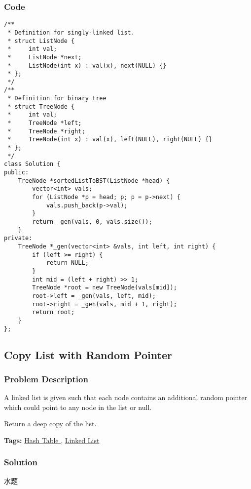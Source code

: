 \documentclass{article}
\begin{document}
\begin{CJK*}{UTF8}{gkai}
\subsubsection*{Code}
\begin{lstlisting}
/**
 * Definition for singly-linked list.
 * struct ListNode {
 *     int val;
 *     ListNode *next;
 *     ListNode(int x) : val(x), next(NULL) {}
 * };
 */
/**
 * Definition for binary tree
 * struct TreeNode {
 *     int val;
 *     TreeNode *left;
 *     TreeNode *right;
 *     TreeNode(int x) : val(x), left(NULL), right(NULL) {}
 * };
 */
class Solution {
public:
    TreeNode *sortedListToBST(ListNode *head) {
        vector<int> vals;
        for (ListNode *p = head; p; p = p->next) {
            vals.push_back(p->val);
        }
        return _gen(vals, 0, vals.size());
    }
private:
    TreeNode *_gen(vector<int> &vals, int left, int right) {
        if (left >= right) {
            return NULL;
        }
        int mid = (left + right) >> 1;
        TreeNode *root = new TreeNode(vals[mid]);
        root->left = _gen(vals, left, mid);
        root->right = _gen(vals, mid + 1, right);
        return root;
    }
}; 
\end{lstlisting}


\subsection{ Copy List with Random Pointer }
\label{ Copy List with Random Pointer }

\subsubsection*{Problem Description}
A linked list is given such that each node contains an additional random pointer which could point to any node in the list or null.

Return a deep copy of the list.


\textbf{Tags: }
\hyperref[ Hash Table ]{ Hash Table },  \hyperref[ Linked List ]{ Linked List }



\subsubsection*{Solution}
水题


\end{CJK*}
\end{document}
